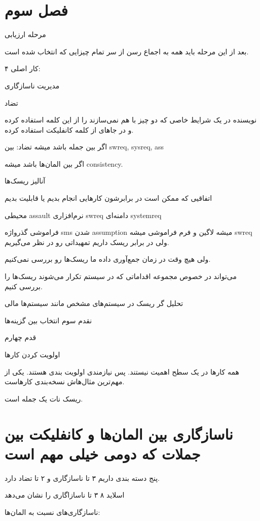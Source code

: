 
\section{فصل سوم}

مرحله ارزیابی

بعد از این مرحله باید همه به اجماع رسن از سر تمام چیزایی که انتخاب شده است.

۴ کار اصلی:

مدیریت ناسازگاری

تضاد

نویسنده در یک شرایط خاصی که دو چیز با هم نمی‌سازند را از این کلمه استفاده کرده و
در جاهای از کلمه کانفلیکت استفاده کرده.

اگر بین جمله باشد میشه تضاد: بین swreq, sysreq, ass

اگر بین المان‌ها باشد میشه consistency.


آنالیز ریسک‌ها

اتفاقیی که ممکن است در برابرشون کار‌هایی انجام بدیم یا قابلیت بدیم

محیطی assault
نرم‌افزاری swreq
دامنه‌ای systemreq

فراموشی گذرواژه 
sms شدن assumption میشه
لاگین و فرم فراموشی میشه swreq
ولی در برابر ریسک داریم تمهیداتی رو در نظر می‌گیریم.


ولی هیچ وقت در زمان جمع‌آوری داده ما ریسک‌ها رو بررسی نمی‌کنیم.

می‌تواند در خصوص مجموعه اقداماتی که در سیستم تکرار می‌شوند ریسک‌ها را بررسی
کنیم.

تحلیل گر ریسک در سیستم‌های مشخص مانند سیستم‌ها مالی

نقدم سوم انتخاب بین گزینه‌ها

قدم چهارم

اولویت کردن کار‌ها

همه کار‌ها در یک سطح اهمیت نیستند. پس نیازمندی اولویت بندی هستند. یکی از
مهم‌ترین مثال‌هاش نسخه‌بندی کار‌هاست.

ریسک نات یک جمله است.


\section{ناسازگاری بین المان‌ها و کانفلیکت بین جملات که دومی خیلی مهم است}

پنج دسته بندی داریم
۳ تا ناسازگاری و ۲ تا تضاد دارد.

اسلاید ۸ ۳ تا ناسازاگاری را نشان می‌دهد

ناسازگاری‌های نسبت به المان‌ها:

